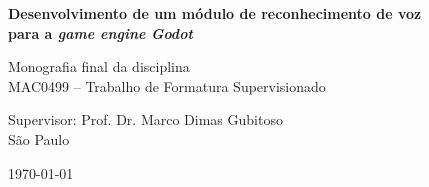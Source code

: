 \newpage
\thispagestyle{empty}
  \begin{center}
    \vspace*{2.3 cm}
    \textbf{\large{Desenvolvimento de um módulo de reconhecimento de voz \\[0.5\baselineskip]
    para a \textit{game engine} \textit{Godot}}}
    \vspace*{2 cm}
  \end{center}

  \vskip 2cm

  \begin{flushright}
    Monografia final da disciplina \\
    MAC0499 -- Trabalho de Formatura Supervisionado
  \end{flushright}

  \vskip 5cm

  \begin{center}
  Supervisor: Prof. Dr. Marco Dimas Gubitoso \\

  \vskip 5cm
  \normalsize{São Paulo}

  \today
  \end{center}
\pagebreak

